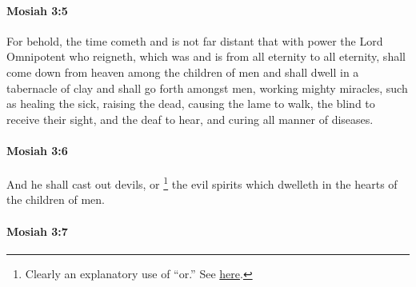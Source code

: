 		\paragraph{Mosiah 3:5} %
			\label{MOSIAH-3-5}

			For behold, the time cometh and is not far distant
			that with power the Lord Omnipotent who reigneth,
			which was and is from all eternity to all eternity,
			shall come down from heaven among the children of men
			and shall dwell in a tabernacle of clay
			and shall go forth amongst men, working mighty miracles,
			such as healing the sick,
			raising the dead,
			causing the lame to walk,
			the blind to receive their sight,
			and the deaf to hear,
			and curing all manner of diseases.

		\paragraph{Mosiah 3:6} %
			\label{MOSIAH-3-6}

			And he shall cast out devils,
			or%
				\footnote{%
					\label{MOSIAH-3-6-NOTE-or}%
					Clearly an explanatory use of ``or.'' See \hyperref[OR-COMMENTARY-explanatory]{here}.
					}
			the evil spirits which dwelleth in the hearts of the children of men.

		\paragraph{Mosiah 3:7} %
			\label{MOSIAH-3-7}


